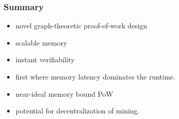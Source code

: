 \documentclass{beamer}
\begin{document}
\begin{frame}
\frametitle{Summary}
\begin{itemize}
\item
novel graph-theoretic proof-of-work design
\item scalable memory
\pause
\item instant verifiability
\pause
\item first where memory latency dominates the runtime.
\pause
\item near-ideal memory bound PoW
\pause
\item potential for decentralization of mining.
\end{itemize}
\end{frame}
\end{document}
